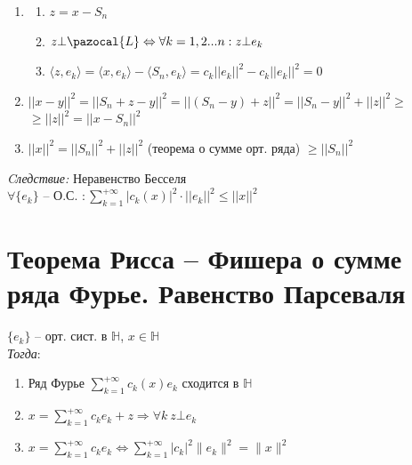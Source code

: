 \documentclass[paper=a4, fontsize=17pt]{article}
\begin{document}
\begin{enumerate}

	\item
	\begin{enumerate}
		\item $z = x - S_n$

		\item $z \bot \pazocal{L} \Leftrightarrow \forall k = 1, 2 ...n : z \bot e_k$

		\item $\langle z, e_k \rangle = \langle x, e_k \rangle - \langle S_n, e_k \rangle = c_k ||e_k||^2 - c_k ||e_k||^2 = 0$
	\end{enumerate}

	\item $||x - y||^2 = ||S_n + z - y||^2 = ||(S_n - y) + z||^2 = ||S_n - y||^2 + ||z||^2 \geqslant$ $\geqslant ||z||^2 = ||x - S_n||^2$

	\item $||x||^2 = ||S_n||^2 + ||z||^2$ (теорема о сумме орт. ряда) $\geqslant ||S_n||^2$
\end{enumerate}

\emph{Cледствие:} Неравенство Бесселя\\

$\forall \{e_k\}$ {{--}} О.С. $:\sum\limits_{k=1}^{+\infty} |c_k(x)|^2 \cdot ||e_k||^2 \leqslant ||x||^2$

\section{Теорема Рисса -- Фишера о сумме ряда Фурье. Равенство Парсеваля}
$\{e_k\}$ -- орт. сист. в $\mathds{H}$, $x \in \mathds{H}$\\

\emph{Тогда}:
\begin{enumerate}
	\item Ряд Фурье $\sum\limits_{k=1}^{+\infty} c_k(x) e_k$ сходится в $\mathds{H}$
	\item $x =\sum\limits_{k=1}^{+\infty} c_k e_k + z \Rightarrow \forall k \ z \bot e_k$
	\item $x =\sum\limits_{k=1}^{+\infty} c_k e_k \Leftrightarrow \sum\limits_{k=1}^{+\infty} \vert c_k \vert^2 \|e_k\|^2=\|x\|^2$
\end{enumerate}
\end{document}
